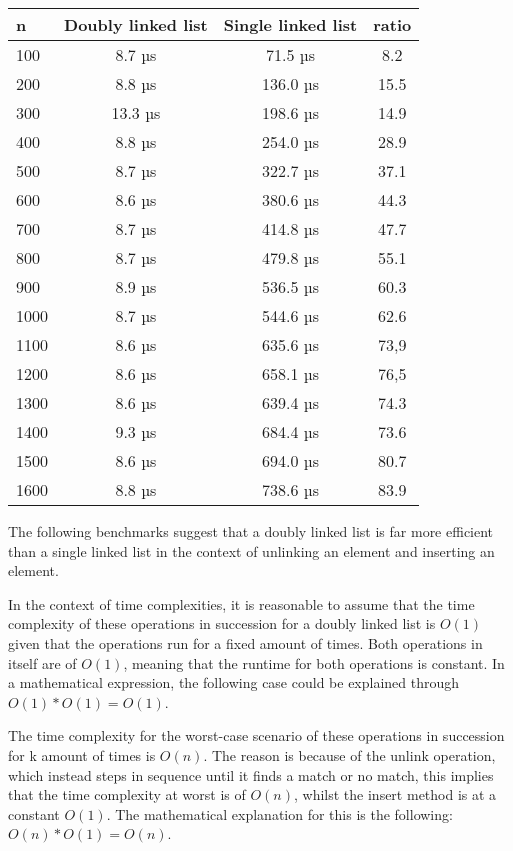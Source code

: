 \documentclass[a4paper,11pt]{article}
\begin{document}
\begin{table}[h]
\begin{center}
\begin{tabular}{l|c|c|c}
\textbf{n} & \textbf{Doubly linked list} & \textbf{Single linked list} & \textbf{ratio}\\
\hline
100      &  8.7 µs & 71.5 µs & 8.2\\
200      &  8.8 µs & 136.0 µs & 15.5\\
300      &  13.3 µs & 198.6 µs & 14.9\\
400      &  8.8 µs & 254.0 µs & 28.9\\
500      &  8.7 µs & 322.7 µs & 37.1\\
600      &  8.6 µs & 380.6 µs & 44.3\\
700      &  8.7 µs & 414.8 µs & 47.7\\
800      &  8.7 µs & 479.8 µs & 55.1\\
900      &  8.9 µs & 536.5 µs & 60.3\\
1000     &  8.7 µs & 544.6 µs & 62.6\\
1100     &  8.6 µs & 635.6 µs & 73,9\\
1200     &  8.6 µs & 658.1 µs & 76,5\\
1300     &  8.6 µs & 639.4 µs & 74.3\\
1400     &  9.3 µs & 684.4 µs & 73.6\\
1500     &  8.6 µs & 694.0 µs & 80.7\\
1600     &  8.8 µs & 738.6 µs & 83.9\\
\end{tabular}
\end{center}
\end{table}
    The following benchmarks suggest that a doubly linked list is far more efficient than a single linked list in the context of unlinking an element and inserting an element. 
    
    In the context of time complexities, it is reasonable to assume that the time complexity of these operations in succession for a doubly linked list is $O(1)$ given that the operations run for a fixed amount of times. Both operations in itself are of $O(1)$, meaning that the runtime for both operations is constant. In a mathematical expression, the following case could be explained through $O(1) * O(1) = O(1)$. 
    
    The time complexity for the worst-case scenario of these operations in succession for k amount of times is $O(n)$. The reason is because of the unlink operation, which instead steps in sequence until it finds a match or no match, this implies that the time complexity at worst is of $O(n)$, whilst the insert method is at a constant $O(1)$. The mathematical explanation for this is the following: $O(n) * O(1) = O(n)$.
\end{document}
